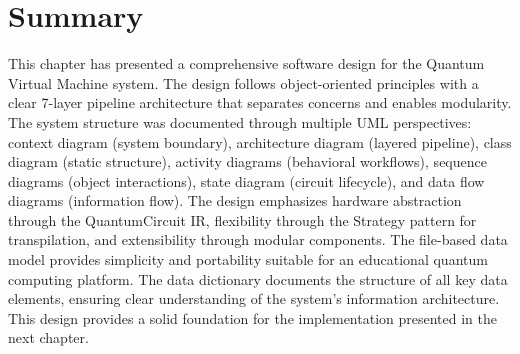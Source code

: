\section{Summary}
This chapter has presented a comprehensive software design for the Quantum Virtual Machine system. The design follows object-oriented principles with a clear 7-layer pipeline architecture that separates concerns and enables modularity. The system structure was documented through multiple UML perspectives: context diagram (system boundary), architecture diagram (layered pipeline), class diagram (static structure), activity diagrams (behavioral workflows), sequence diagrams (object interactions), state diagram (circuit lifecycle), and data flow diagrams (information flow). The design emphasizes hardware abstraction through the QuantumCircuit IR, flexibility through the Strategy pattern for transpilation, and extensibility through modular components. The file-based data model provides simplicity and portability suitable for an educational quantum computing platform. The data dictionary documents the structure of all key data elements, ensuring clear understanding of the system's information architecture. This design provides a solid foundation for the implementation presented in the next chapter.
